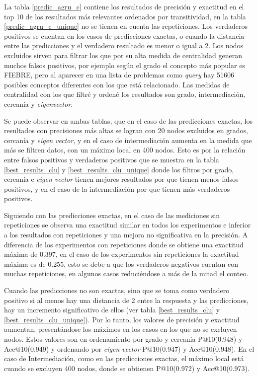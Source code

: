La tabla \ref{predic_agru_c} contiene los resultados de precisión y exactitud en el top 10 de los resultados más relevantes ordenados por transitividad, en la tabla \ref{predic_agru_c_unique} no se tienen en cuenta las repeticiones. Los verdaderos positivos se cuentan en los casos de predicciones exactas, o cuando la distancia entre las predicciones y el verdadero resultado es menor o igual a 2. Los nodos excluidos sirven para filtrar los que por su alta medida de centralidad generan muchos falsos positivos, por ejemplo según el grado el concepto más popular es FIEBRE, pero al aparecer en una lista de problemas como \textit{query} hay \num{51606} posibles conceptos diferentes con los que está relacionado. Las medidas de centralidad con los que filtré y ordené los resultados son grado, intermediación, cercanía y \textit{eigenvector}. 

Se puede observar en ambas tablas, que en el caso de las predicciones exactas, los resultados con precisiones más altas se logran con 20 nodos excluidos en grados, cercanía y \textit{eigen vector}, y en el caso de intermediación aumenta en la medida que más se filtren datos, con un máximo local en 400 nodos. Esto es por la relación entre falsos positivos y verdaderos positivos que se muestra en la tabla \ref{best_results_clu} y \ref{best_results_clu_unique} donde los filtros por grado, cercanía e \textit{eigen vector} tienen mejores resultados por que tienen menos falsos positivos, y en el caso de la intermediación por que tienen más verdaderos positivos.

Siguiendo con las predicciones exactas, en el caso de las mediciones sin repeticiones se observa una exactitud similar en todos los experimentos e inferior a los resultados con repeticiones y una mejora no significativa en la precisión. A diferencia de los experimentos con repeticiones donde se obtiene una exactitud máxima de \num{0,397}, en el caso de los experimentos sin repeticiones la exactitud máxima es de \num{0,255}, esto se debe a que los verdaderos negativos cuentan con muchas repeticiones, en algunos casos reduciéndose a más de la mitad el conteo.

Cuando las predicciones no son exactas, sino que se toma como verdadero positivo si al menos hay una distancia de 2 entre la respuesta y las predicciones, hay un incremento significativo de ellos (ver tabla \ref{best_results_clu} y \ref{best_results_clu_unique}). Por lo tanto, los valores de precisión y exactitud aumentan, presentándose los máximos en los casos en los que no se excluyen nodos. Estos valores son en ordenamiento por grado y cercanía P@10(\num{0,948}) y Acc@10(\num{0,949}) y ordenando por \textit{eigen vector} P@10(\num{0,947}) y Acc@10(\num{0,948}). En el caso de Intermediación, como en las predicciones exactas, el máximo local está cuando se excluyen 400 nodos, donde se obtienen P@10(\num{0,972}) y Acc@10(\num{0,973}). 


